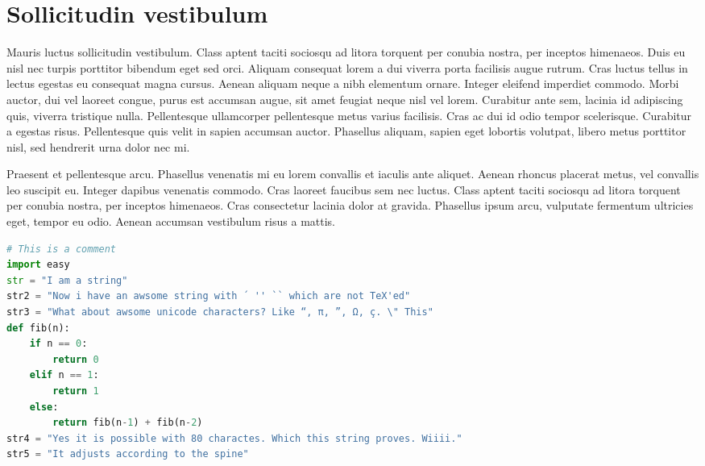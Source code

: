 \section{Sollicitudin vestibulum}
Mauris luctus sollicitudin vestibulum. Class aptent taciti sociosqu ad litora torquent per conubia nostra, per inceptos himenaeos. Duis eu nisl nec turpis porttitor bibendum eget sed orci. Aliquam consequat lorem a dui viverra porta facilisis augue rutrum. Cras luctus tellus in lectus egestas eu consequat magna cursus. Aenean aliquam neque a nibh elementum ornare. Integer eleifend imperdiet commodo. Morbi auctor, dui vel laoreet congue, purus est accumsan augue, sit amet feugiat neque nisl vel lorem. Curabitur ante sem, lacinia id adipiscing quis, viverra tristique nulla. Pellentesque ullamcorper pellentesque metus varius facilisis. Cras ac dui id odio tempor scelerisque. Curabitur a egestas risus. Pellentesque quis velit in sapien accumsan auctor. Phasellus aliquam, sapien eget lobortis volutpat, libero metus porttitor nisl, sed hendrerit urna dolor nec mi.

Praesent et pellentesque arcu. Phasellus venenatis mi eu lorem convallis et iaculis ante aliquet. Aenean rhoncus placerat metus, vel convallis leo suscipit eu. Integer dapibus venenatis commodo. Cras laoreet faucibus sem nec luctus. Class aptent taciti sociosqu ad litora torquent per conubia nostra, per inceptos himenaeos. Cras consectetur lacinia dolor at gravida. Phasellus ipsum arcu, vulputate fermentum ultricies eget, tempor eu odio. Aenean accumsan vestibulum risus a mattis.

\begin{adjustwidth*}{0cm}{-0.4cm}
\begin{lstlisting}[language=Python,caption=Fibonacci2,label=Fibonacci2]
# This is a comment
import easy
str = "I am a string"
str2 = "Now i have an awsome string with ´ '' `` which are not TeX'ed"
str3 = "What about awsome unicode characters? Like “, π, ”, Ω, ç. \" This"
def fib(n):
    if n == 0:
        return 0
    elif n == 1:
        return 1
    else:
        return fib(n-1) + fib(n-2)
str4 = "Yes it is possible with 80 charactes. Which this string proves. Wiiii."
str5 = "It adjusts according to the spine"
\end{lstlisting}
\end{adjustwidth*}